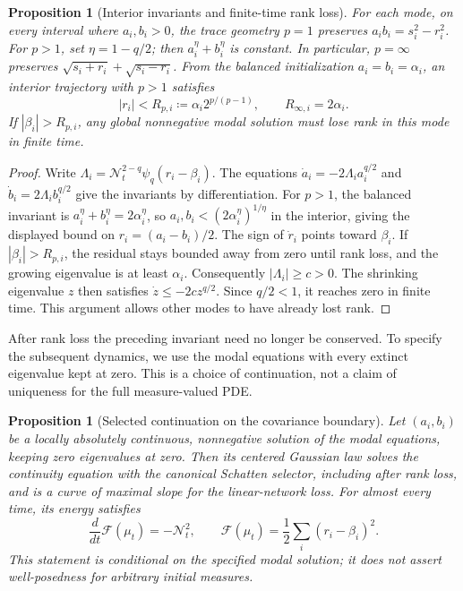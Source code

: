 \documentclass{article}
\newtheorem{proposition}[theorem]{Proposition}
\newcommand{\MF}{\mathcal{F}}
\begin{document}
\begin{proposition}[Interior invariants and finite-time rank loss]
\label{app-prop:rank-one-invariants}
For each mode, on every interval where $a_i,b_i>0$, the trace geometry
$p=1$ preserves $a_i b_i=s_i^2-r_i^2$. For $p>1$, set
$\eta=1-q/2$; then $a_i^\eta+b_i^\eta$ is constant. In particular,
$p=\infty$ preserves $\sqrt{s_i+r_i}+\sqrt{s_i-r_i}$.
From the balanced initialization $a_i=b_i=\alpha_i$, an interior trajectory
with $p>1$ satisfies
$$
 |r_i|<R_{p,i}\coloneqq \alpha_i 2^{p/(p-1)},
 \qquad R_{\infty,i}=2\alpha_i.
$$
If $|\beta_i|>R_{p,i}$, any global nonnegative modal solution must lose
rank in this mode in finite time.
\end{proposition}

\begin{proof}
Write $\Lambda_i=\mathcal N_t^{2-q}\psi_q(r_i-\beta_i)$.
The equations $\dot a_i=-2\Lambda_i a_i^{q/2}$ and
$\dot b_i=2\Lambda_i b_i^{q/2}$ give the invariants by differentiation.
For $p>1$, the balanced invariant is $a_i^\eta+b_i^\eta=2\alpha_i^\eta$,
so $a_i,b_i<(2\alpha_i^\eta)^{1/\eta}$ in the interior, giving the
displayed bound on $r_i=(a_i-b_i)/2$.
The sign of $\dot r_i$ points toward $\beta_i$. If
$|\beta_i|>R_{p,i}$, the residual stays bounded away from zero until rank
loss, and the growing eigenvalue is at least $\alpha_i$.
Consequently $|\Lambda_i|\ge c>0$. The shrinking eigenvalue $z$ then
satisfies $\dot z\le-2c z^{q/2}$. Since $q/2<1$, it reaches zero in
finite time. This argument allows other modes to have already lost rank.
\end{proof}

After rank loss the preceding invariant need no longer be conserved. To specify
the subsequent dynamics, we use the modal equations with every extinct
eigenvalue kept at zero. This is a choice of continuation, not a claim of
uniqueness for the full measure-valued PDE.

\begin{proposition}[Selected continuation on the covariance boundary]
\label{app-prop:gaussian-boundary}
Let $(a_i,b_i)$ be a locally absolutely continuous, nonnegative solution
of the modal equations, keeping zero eigenvalues at zero. Then its centered
Gaussian law solves the continuity equation with the canonical Schatten
selector, including after rank loss, and is a curve of maximal slope for
the linear-network loss. For almost every time, its energy satisfies
$$
 \frac{d}{dt}\MF(\mu_t)=-\mathcal N_t^2,
 \qquad \MF(\mu_t)=\frac12\sum_i(r_i-\beta_i)^2.
$$
This statement is conditional on the specified modal solution; it does not
assert well-posedness for arbitrary initial measures.
\end{proposition}
\end{document}
